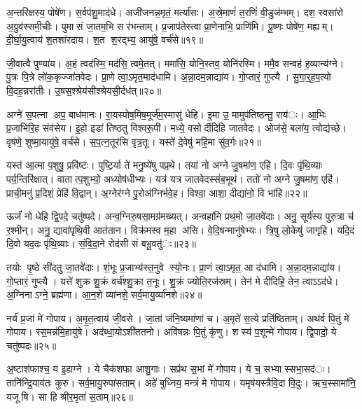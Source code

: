 अ॒न्तरि॑क्षस्य॒ पोषे॑ण। स॒र्वप॑शु॒माद॑धे। अजी॑जनन्न॒मृतं॒ मर्त्या॑सः। अ॒स्रे॒माणं॑ त॒रणिं॑ वी॒डुज॑म्भम्। दश॒ स्वसा॑रो अ॒ग्रुव॑स्समी॒चीः। पुमासं जा॒तम॒भि सर॑भन्ताम्। प्र॒जाप॑तेस्त्वा प्रा॒णेनाभि॒ प्राणि॑मि। पू॒ष्णः पोषे॑ण॒ मह्यम्। दी॒र्घा॒यु॒त्वाय॑ श॒तशा॑रदाय। श॒त श॒रद्भ्य॒ आयु॑षे॒ वर्च॑से॥१९॥

जी॒वात्वै पुण्या॑य। अ॒हं त्वद॑स्मि॒ मद॑सि॒ त्वमे॒तत्। ममा॑सि॒ योनि॒स्तव॒ योनि॑रस्मि। ममै॒व सन्वह॑ ह॒व्यान्य॑ग्ने। पु॒त्रः पि॒त्रे लो॑क॒कृज्जा॑तवेदः। प्रा॒णे त्वा॒ऽमृत॒माद॑धामि। अ॒न्ना॒दम॒न्नाद्या॑य। गो॒प्तारं॒ गुप्त्यै। सु॒गा॒र्॒ह॒प॒त्यो वि॒दह॒न्नरा॑तीः। उ॒षस॒श्श्रेय॑सीश्श्रेयसी॒र्दध॑त्॥२०॥

अग्ने॑ स॒पत्ना अप॒ बाध॑मानः। रा॒यस्पोष॒मिष॒मूर्ज॑म॒स्मासु॑ धेहि। इ॒मा उ॒ मामुप॑तिष्ठन्तु॒ राय॑ः। आ॒भिः प्र॒जाभि॑रि॒ह संव॑सेय। इ॒हो इडा॑ तिष्ठतु विश्वरू॒पी। मध्ये॒ वसोर्दीदिहि जातवेदः। ओज॑से॒ बला॑य॒ त्वोद्य॑च्छे। वृष॑णे॒ शुष्मा॒यायु॑षे॒ वर्च॑से। स॒प॒त्न॒तूर॑सि वृत्र॒तूः। यस्ते॑ दे॒वेषु॑ महि॒मा सु॑व॒र्गः॥२१॥

यस्त॑ आ॒त्मा प॒शुषु॒ प्रवि॑ष्टः। पुष्टि॒र्या ते॑ मनु॒ष्ये॑षु पप्र॒थे। तया॑ नो अग्ने जु॒षमा॑ण॒ एहि॑। दि॒वः पृ॑थि॒व्याः पर्य॒न्तिरि॑क्षात्। वातात्प॒शुभ्यो॒ अध्योष॑धीभ्यः। यत्र॑ यत्र जातवेदस्संब॒भूथ॑। ततो॑ नो अग्ने जु॒षमा॑ण॒ एहि॑। प्राची॒मनु॑ प्र॒दिशं॒ प्रेहि॑ वि॒द्वान्। अ॒ग्नेर॑ग्ने पु॒रोअ॑ग्निर्भवे॒ह। विश्वा॒ आशा॒ दीद्या॑नो॒ वि भा॑हि॥२२॥

ऊर्जं॑ नो धेहि द्वि॒पदे॒ चतु॑ष्पदे। अन्व॒ग्निरु॒षसा॒मग्र॑मख्यत्। अन्वहा॑नि प्रथ॒मो जा॒तवे॑दाः। अनु॒ सूर्य॑स्य पुरु॒त्रा च॑ र॒श्मीन्। अनु॒ द्यावा॑पृथि॒वी आत॑तान। विक्र॑मस्व म॒हा अ॑सि। वे॒दि॒षन्मानु॑षेभ्यः। त्रि॒षु लो॒केषु॑ जागृहि। यदि॒दं दि॒वो यद॒दः पृ॑थि॒व्याः। सं॒वि॒दा॒ने रोद॑सी सं बभू॒वतु॑ः॥२३॥

तयोः पृ॒ष्ठे सी॑दतु जा॒तवे॑दाः। शं॒भूः प्र॒जाभ्य॑स्त॒नुवे स्यो॒नः। प्रा॒णं त्वा॒ऽमृत॒ आ द॑धामि। अ॒न्ना॒दम॒न्नाद्या॑य। गो॒प्तारं॒ गुप्त्यै। यत्ते॑ शुक्र शु॒क्रं वर्च॑श्शु॒क्रा त॒नूः। शु॒क्रं ज्योति॒रज॑स्रम्। तेन॑ मे दीदिहि॒ तेन॒ त्वाऽऽद॑धे। अ॒ग्निनाऽग्ने॒ ब्रह्म॑णा। आ॒न॒शे व्या॑नशे॒ सर्व॒मायु॒र्व्या॑नशे॥२४॥

नर्य॑ प्र॒जां मे॑ गोपाय। अ॒मृ॒त॒त्वाय॑ जी॒वसे। जा॒तां ज॑नि॒ष्यमा॑णां च। अ॒मृते॑ स॒त्ये प्रति॑ष्ठिताम्। अथ॑र्व पि॒तुं मे॑ गोपाय। रस॒मन्न॑मि॒हायु॑षे। अद॑ब्धा॒योऽशी॑ततनो। अवि॑षन्नः पि॒तुं कृ॑णु। शस्य॑ प॒शून्मे॑ गोपाय। द्वि॒पादो॒ ये चतु॑ष्पदः॥२५॥

अ॒ष्टाश॑फाश्च॒ य इ॒हाग्ने। ये चैक॑शफा आशु॒गाः। सप्र॑थ स॒भां मे॑ गोपाय। ये च॒ सभ्यास्सभा॒सद॑ः। तानि॑न्द्रि॒याव॑तः कुरु। सर्व॒मायु॒रुपा॑सताम्। अहे॑ बुध्निय॒ मन्त्रं॑ मे गोपाय। यमृष॑यस्त्रैवि॒दा वि॒दुः। ऋच॒स्सामा॑नि॒ यजूषि। सा हि श्रीर॒मृता॑ स॒ताम्॥२६॥

